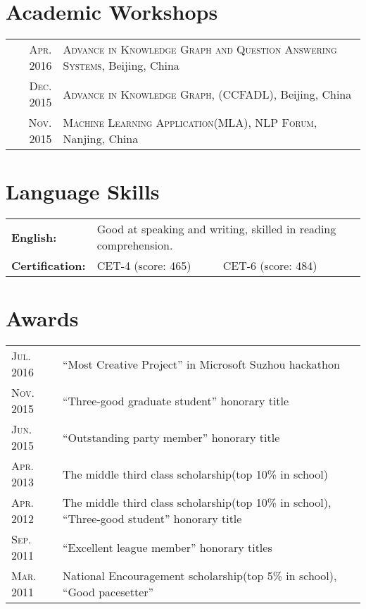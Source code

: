 \documentclass[a4paper,10pt]{article}
\begin{document}

\section{Academic Workshops}

\begin{tabular}{rp{15cm}}
\textsc{Apr.} 2016  & \textsc{Advance in Knowledge Graph and Question Answering Systems}, Beijing, China \\
\textsc{Dec.} 2015  & \textsc{Advance in Knowledge Graph}, (CCFADL), Beijing, China \\
\textsc{Nov.} 2015 	& \textsc{Machine Learning Application(MLA), NLP Forum}, Nanjing, China \\
%
\end{tabular}


\section{Language Skills}


\begin{tabular}{R{3.1cm}l}

\textbf{English:} 		& Good at speaking and writing, skilled in reading comprehension. \\

\textbf{Certification:}	& CET-4 (score: 465)   \ \ \ \ \     CET-6 (score: 484) \\

\end{tabular}


\section{Awards}

\begin{tabular}{R{2.1cm}l}
\textsc{Jul. 2016} 	& ``Most Creative Project'' in Microsoft Suzhou hackathon \\
\textsc{Nov. 2015} 	& ``Three-good graduate student'' honorary title \\
\textsc{Jun. 2015} 	& ``Outstanding party member'' honorary title \\
\textsc{Apr. 2013} 	& The middle third class scholarship(top 10\% in school) \\
\textsc{Apr. 2012} 	& The middle third class scholarship(top 10\% in school), ``Three-good student'' honorary title \\
\textsc{Sep. 2011} 	& ``Excellent league member'' honorary titles \\
\textsc{Mar. 2011} 	& National Encouragement scholarship(top  5\% in school), ``Good pacesetter'' \\
\end{tabular}

\end{document}
